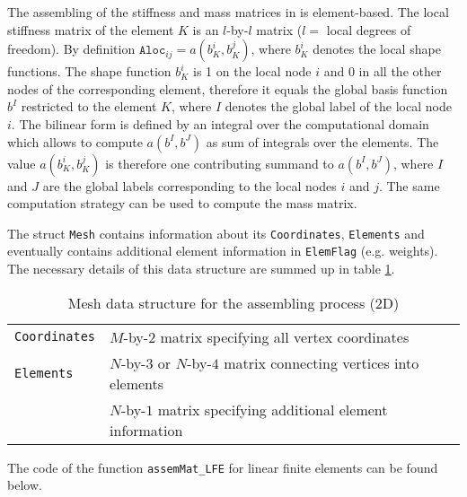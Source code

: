  The assembling of the stiffness and mass matrices in \LIBNAME is element-based. The local stiffness matrix of the element $K$  is an $l$-by-$l$ matrix ($l =$ local degrees of freedom). By definition $\mathtt{Aloc}_{ij} = a(b_K^i,b_K^j)$, where $b_K^i$ denotes the local shape functions. The shape function $b_K^i$ is 1 on the local node $i$ and 0 in all the other nodes of the corresponding element, therefore it equals the global basis function $b^I$ restricted to the element $K$, where $I$ denotes the global label of the local node $i$. The bilinear form is defined by an integral over the computational domain which allows to compute $a(b^I,b^J)$ as sum of integrals over the elements. The value $a(b_K^i,b_K^j)$ is therefore one contributing summand to $a(b^I,b^J)$, where $I$ and $J$ are the global labels corresponding to the local nodes $i$ and $j$. The same computation strategy can be used to compute the mass matrix.

The struct {\tt Mesh} contains information about its {\tt Coordinates}, {\tt Elements} and eventually contains additional element information in {\tt ElemFlag} (e.g. weights). The necessary details of this data structure are summed up in table \ref{tab:assem_mesh}.

\begin{table}[htb]
  \begin{tabular}{p{2cm}p{9cm}}
	{\tt Coordinates} & {\small $M$-by-$2$ matrix specifying all vertex coordinates} \\
	{\tt Elements} & {\small $N$-by-$3$ or $N$-by-$4$ matrix connecting vertices into elements} \\
	\ttindex{ElemFlag} & {\small $N$-by-$1$ matrix specifying additional element information}
  \end{tabular}
  \caption{Mesh data structure for the assembling process (2D)}
  \label{tab:assem_mesh}
\end{table}

The code of the function {\tt assemMat\_LFE} for linear finite elements can be found below.

